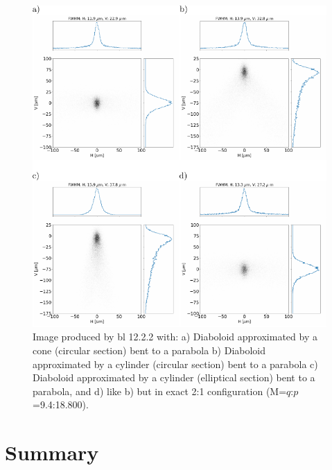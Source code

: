 \documentclass{iucr}              %
\begin{document}
\begin{figure}\label{fig:finalcomparison}
\includegraphics[width=1.0\textwidth]{figures/fig9.pdf}
% 


\caption{ Image produced by bl 12.2.2 with: 
a) Diaboloid approximated by a cone (circular section) bent to a parabola b) Diaboloid approximated by a cylinder (circular section) bent to a parabola c) Diaboloid approximated by a cylinder (elliptical section) bent to a parabola, and d) like b) but in exact 2:1 configuration (M=$q$:$p$=9.4:18.800).
}
\end{figure}


\section{Summary}
\label{sec:summary}
\end{document}
